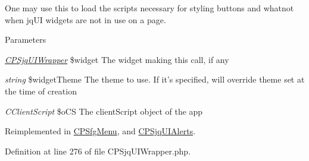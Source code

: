One may use this to load the scripts necessary for styling buttons and whatnot when jqUI widgets are not in use on a page.


\begin{DoxyParams}{Parameters}
\item[{\em \hyperlink{classCPSjqUIWrapper}{CPSjqUIWrapper}}]\$widget The widget making this call, if any \item[{\em string}]\$widgetTheme The theme to use. If it's specified, will override theme set at the time of creation \item[{\em CClientScript}]\$oCS The clientScript object of the app \end{DoxyParams}


Reimplemented in \hyperlink{classCPSfgMenu_a561cda05113b81fc962133829351f41e}{CPSfgMenu}, and \hyperlink{classCPSjqUIAlerts_a561cda05113b81fc962133829351f41e}{CPSjqUIAlerts}.



Definition at line 276 of file CPSjqUIWrapper.php.




